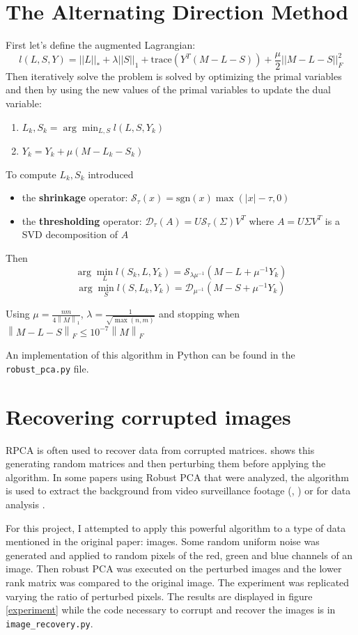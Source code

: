 \documentclass[a4paper]{article}
\newcommand{\tr}[1]{\text{trace}(#1)}
\newcommand\norm[2]{\left\lVert#1\right\rVert _{#2}}
\begin{document}
\section{The Alternating Direction Method}
First let's define the augmented Lagrangian:
$$l(L,S, Y) = ||L||_* + \lambda ||S||_1 + \tr{Y^T (M - L - S)} + \frac{\mu}{2} ||M - L - S||^2_F$$
Then iteratively solve the problem is solved by optimizing the primal variables and then by using the new values of the primal variables to update the dual variable:
\begin{enumerate}
    \item $L_k, S_k = \arg \min_{L, S} l(L, S, Y_k)$
    \item $Y_k = Y_k + \mu ( M - L_k - S_k)$
\end{enumerate}
To compute $L_k, S_k$ \cite{RPCA} introduced
\begin{itemize}
    \item the \textbf{shrinkage} operator: $\mathcal{S}_\tau(x) = \text{sgn}(x)\max(|x|-\tau, 0)$
    \item the \textbf{thresholding} operator: $\mathcal{D}_\tau (A) = U \mathcal{S}_\tau(\Sigma) V^T$ where $A = U \Sigma V^T$ is a SVD decomposition of $A$
\end{itemize}
Then
$$\arg \min _L l(S_k, L, Y_k) = \mathcal{S}_{\lambda \mu^{-1}} (M - L + \mu^{-1}Y_k)$$
$$\arg \min _S l(S, L_k, Y_k) = \mathcal{D}_{\mu^{-1}} (M - S + \mu^{-1}Y_k)$$

Using $\mu = \frac{nm}{4\norm{M}{1}}$, $\lambda = \frac{1}{\sqrt{\max(n, m)}}$ and stopping when $\norm{M-L-S}{F} \leq 10^{-7} \norm{M}{F}$

An implementation of this algorithm in Python can be found in the \texttt{robust\_pca.py} file.

\section{Recovering corrupted images}
RPCA is often used to recover data from corrupted matrices. \cite{RPCA} shows this generating random matrices and then perturbing them before applying the algorithm. In some papers using Robust PCA that were analyzed, the algorithm is used to extract the background from video surveillance footage (\cite{RPCA}, \cite{fast}) or for data analysis \cite{data}.

For this project, I attempted to apply this powerful algorithm to a type of data mentioned in the original paper: images.
Some random uniform noise was generated and applied to random pixels of the red, green and blue channels of an image. Then robust PCA was executed on the perturbed images and the lower rank matrix was compared to the original image.
The experiment was replicated varying the ratio of perturbed pixels. The results are displayed in figure \ref{experiment} while the code necessary to corrupt and recover the images is in \texttt{image\_recovery.py}.
\end{document}
